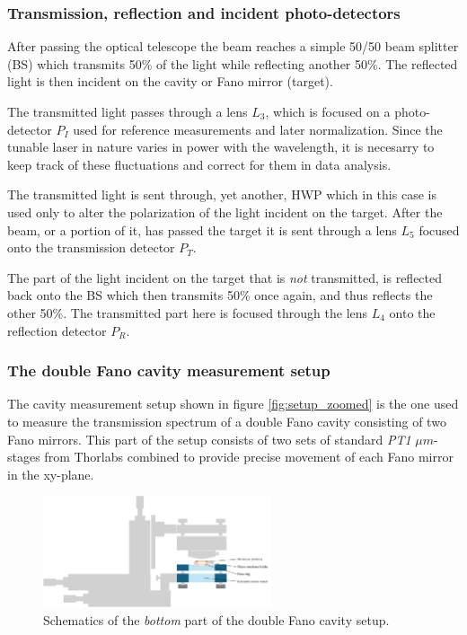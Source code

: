 \subsubsection{Transmission, reflection and incident photo-detectors}

After passing the optical telescope the beam reaches a simple 50/50 beam splitter (BS) which transmits 50\% of the light while reflecting another 50\%. The reflected light is then incident on the cavity or Fano mirror (target). 

The transmitted light passes through a lens $L_3$, which is focused on a photo-detector $P_I$ used for reference measurements and later normalization. Since the tunable laser in nature varies in power with the wavelength, it is necesarry to keep track of these fluctuations and correct for them in data analysis. 

The transmitted light is sent through, yet another, HWP which in this case is used only to alter the polarization of the light incident on the target. After the beam, or a portion of it, has passed the target it is sent through a lens $L_5$ focused onto the transmission detector $P_T$.

The part of the light incident on the target that is \emph{not} transmitted, is reflected back onto the BS which then transmits 50\% once again, and thus reflects the other 50\%. The transmitted part here is focused through the lens $L_4$ onto the reflection detector $P_R$.

\subsubsection{The double Fano cavity measurement setup}

The cavity measurement setup shown in figure \ref{fig:setup_zoomed} is the one used to measure the transmission spectrum of a double Fano cavity consisting of two Fano mirrors. This part of the setup consists of two sets of standard \emph{PT1} $\mu m$-stages from Thorlabs combined to provide precise movement of each Fano mirror in the xy-plane. 

\begin{figure}[h!]
    \centering
    \includegraphics[width=0.6\textwidth]{figures/setup_bottom.pdf}
    \caption{Schematics of the \emph{bottom} part of the double Fano cavity setup.}
    \label{fig:setup_bottom}
\end{figure}

